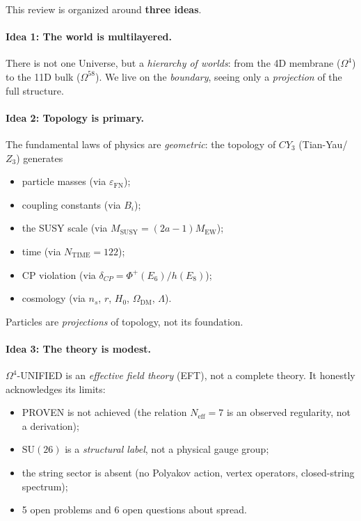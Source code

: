 \documentclass[11pt,a4paper]{article}
\newcommand{\SU}{\mathrm{SU}}
\newcommand{\CY}{CY_3}
\newcommand{\Om}{\Omega^4}
\newcommand{\Omfi}{\Omega^{58}}
\newcommand{\Neff}{N_{\text{eff}}}
\newcommand{\MEW}{M_{\text{EW}}}
\newcommand{\MSUSY}{M_{\text{SUSY}}}
\newcommand{\epsFN}{\varepsilon_{\text{FN}}}
\theoremstyle{definition}
\begin{document}
This review is organized around \textbf{three ideas}.

\paragraph{Idea 1: The world is multilayered.}
There is not one Universe, but a \emph{hierarchy of worlds}: from the 4D membrane 
($\Om$) to the 11D bulk ($\Omfi$). We live on the \emph{boundary}, 
seeing only a \emph{projection} of the full structure.

\paragraph{Idea 2: Topology is primary.}
The fundamental laws of physics are \emph{geometric}: the topology 
of $\CY$ (Tian-Yau/$Z_3$) generates
\begin{itemize}
    \item particle masses (via $\epsFN$);
    \item coupling constants (via $B_i$);
    \item the SUSY scale (via $\MSUSY = (2a-1) \MEW$);
    \item time (via $N_{\text{TIME}} = 122$);
    \item CP violation (via $\delta_{CP} = \Phi^+(E_6)/h(E_8)$);
    \item cosmology (via $n_s$, $r$, $H_0$, $\Omega_{\text{DM}}$, 
          $\Lambda$).
\end{itemize}
Particles are \emph{projections} of topology, not its foundation.

\paragraph{Idea 3: The theory is modest.}
$\Om$-UNIFIED is an \emph{effective field theory} (EFT), not a complete 
theory. It honestly acknowledges its limits:
\begin{itemize}
    \item PROVEN is not achieved (the relation $\Neff = 7$ is an observed 
          regularity, not a derivation);
    \item $\SU(26)$ is a \emph{structural label}, not a physical 
          gauge group;
    \item the string sector is absent (no Polyakov action, 
          vertex operators, closed-string spectrum);
    \item 5 open problems and 6 open questions about spread.
\end{itemize}
\end{document}
